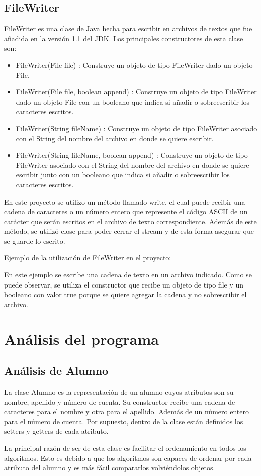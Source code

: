 \documentclass[11pt]{article}
\begin{document}
\subsection{FileWriter}

FileWriter es una clase de Java hecha para escribir en archivos de textos que fue añadida en la versión 1.1 del JDK. Los principales constructores de esta clase son:
\begin{itemize}
\item FileWriter(File file) : Construye un objeto de tipo FileWriter dado un objeto File.
\item FileWriter(File file, boolean append) : Construye un objeto de tipo FileWriter dado un objeto File con un booleano que indica si añadir o sobreescribir los caracteres escritos.
\item FileWriter(String fileName) : Construye un objeto de tipo FileWriter asociado con el String del nombre del archivo en donde se quiere escribir.
\item FileWriter(String fileName, boolean append) : Construye un objeto de tipo FileWriter asociado con el String del nombre del archivo en donde se quiere escribir junto con un booleano que indica si añadir o sobreescribir los caracteres escritos.
\end{itemize}
En este proyecto se utilizo un método llamado write, el cual puede recibir una cadena de caracteres o un número entero que represente el código ASCII de un carácter que serán escritos en el archivo de texto correspondiente. Además de este método, se utilizó close para poder cerrar el stream y de esta forma asegurar que se guarde lo escrito.

Ejemplo de la utilización de FileWriter en el proyecto:

En este ejemplo se escribe una cadena de texto en un archivo indicado. Como se puede observar, se utiliza el constructor que recibe un objeto de tipo file y un booleano con valor true porque se quiere agregar la cadena y no sobrescribir el archivo.


\section{Análisis del programa}
\subsection{Análisis de Alumno}
La clase Alumno es la representación de un alumno cuyos atributos son su nombre, apellido y número de cuenta. Su constructor recibe una cadena de caracteres para el nombre y otra para el apellido. Además de un número entero para el número de cuenta. Por supuesto, dentro de la clase están definidos los setters y getters de cada atributo.
\par
La principal razón de ser de esta clase es facilitar el ordenamiento en todos los algoritmos. Esto es debido a que los algoritmos son capaces de ordenar por cada atributo del alumno y es más fácil compararlos volviéndolos objetos.
\end{document}

